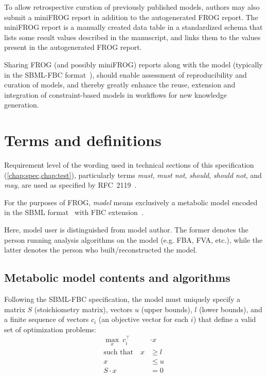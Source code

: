 To allow retrospective curation of previously published models, authors may also submit a miniFROG report in addition to the autogenerated FROG report. The miniFROG report is a manually created data table in a standardized schema that lists some result values described in the manuscript, and links them to the values present in the autogenerated FROG report.

Sharing FROG (and possibly miniFROG) reports along with the model (typically in the SBML-FBC format~\cite{olivier2018sbmlfbc}), should enable assessment of reproducibility and curation of models, and thereby greatly enhance the reuse, extension and integration of constraint-based models in workflows for new knowledge generation. 

\section{Terms and definitions}

Requirement level of the wording used in technical sections of this specification (\cref{chap:spec,chap:test}), particularly terms \emph{must}, \emph{must not}, \emph{should}, \emph{should not}, and \emph{may}, are used as specified by RFC~2119~\cite{rfc2119}.

For the purposes of FROG, \emph{model} means exclusively a metabolic model encoded in the SBML format~\cite{hucka2003systems,keating2020sbml} with FBC extension~\cite{olivier2018sbmlfbc}.

Here, model user is distinguished from model author. The former denotes the
person running analysis algorithms on the model (e.g. FBA, FVA, etc.), while the
latter denotes the person who built/reconstructed the model. 

\subsection{Metabolic model contents and algorithms}
\label{sec:algos}

Following the SBML-FBC specification, the model must uniquely specify a matrix $S$ (stoichiometry matrix), vectors $u$ (upper bounds), $l$ (lower bounds), and a finite sequence of vectors $c_i$ (an objective vector for each $i$) that define a valid set of optimization problems:
\begin{align*}
\max_x\ c_i^\intercal &\cdot x \\
\text{such that}\quad
x & \geq l \\
x & \leq u \\
S\cdot x &= 0
\end{align*}


